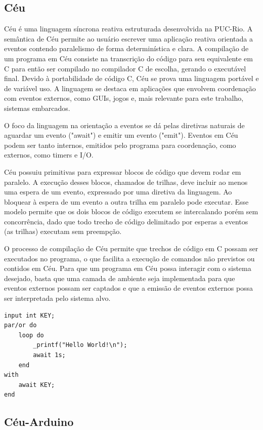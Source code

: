 \documentclass{article}
\begin{document}
\subsection{Céu}
\tab Céu é uma linguagem síncrona reativa estruturada desenvolvida na PUC-Rio. A semântica de Céu permite ao usuário escrever uma aplicação reativa orientada a eventos contendo paralelismo de forma determinística e clara. A compilação de um programa em Céu consiste na transcrição do código para seu equivalente em C para então ser compilado no compilador C de escolha, gerando o executável final. Devido à portabilidade de código C, Céu se prova uma linguagem portável e de variável uso. A linguagem se destaca em aplicações que envolvem coordenação com eventos externos, como GUIs, jogos e, mais relevante para este trabalho, sistemas embarcados.
\par O foco da linguagem na orientação a eventos se dá pelas diretivas naturais de aguardar um evento ("await") e emitir um evento ("emit"). Eventos em Céu podem ser tanto internos, emitidos pelo programa para coordenação, como externos, como timers e I/O.
\par Céu possuiu primitivas para expressar blocos de código que devem rodar em paralelo. A execução desses blocos, chamados de trilhas, deve incluir ao menos uma espera de um evento, expressado por uma diretiva da linguagem. Ao bloquear à espera de um evento a outra trilha em paralelo pode executar. Esse modelo permite que os dois blocos de código executem se intercalando porém sem concorrência, dado que todo trecho de código delimitado por esperas a eventos (as trilhas) executam sem preempção.
\par O processo de compilação de Céu permite que trechos de código em C possam ser executados no programa, o que facilita a execução de comandos não previstos ou contidos em Céu. Para que um programa em Céu possa interagir com o sistema desejado, basta que uma camada de ambiente seja implementada para que eventos externos possam ser captados e que a emissão de eventos externos possa ser interpretada pelo sistema alvo.
\begin{lstlisting}[style=CStyle,label=ceu1,caption=Aplicação em Céu que imprime mensagem cada segundo]
input int KEY;
par/or do
    loop do
        _printf("Hello World!\n");
        await 1s;
    end
with
    await KEY;
end
\end{lstlisting}
\subsection{Céu-Arduino}
\end{document}

